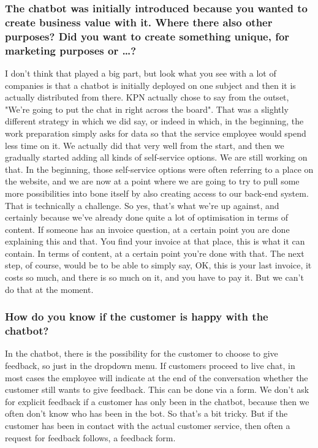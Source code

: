 \begin{appendices}
	\subsubsection{The chatbot was initially introduced because you wanted to create business value with it. Where there also other purposes? Did you want to create something unique, for marketing purposes or …?}
	I don't think that played a big part, but look what you see with a lot of companies is that a chatbot is initially deployed on one subject and then it is actually distributed from there. KPN actually chose to say from the outset, "We're going to put the chat in right across the board". That was a slightly different strategy in which we did say, or indeed in which, in the beginning, the work preparation simply asks for data so that the service employee would spend less time on it. We actually did that very well from the start, and then we gradually started adding all kinds of self-service options. We are still working on that. In the beginning, those self-service options were often referring to a place on the website, and we are now at a point where we are going to try to pull some more possibilities into bone itself by also creating access to our back-end system. That is technically a challenge. So yes, that's what we're up against, and certainly because we've already done quite a lot of optimisation in terms of content. If someone has an invoice question, at a certain point you are done explaining this and that. You find your invoice at that place, this is what it can contain. In terms of content, at a certain point you're done with that. The next step, of course, would be to be able to simply say, OK, this is your last invoice, it costs so much, and there is so much on it, and you have to pay it. But we can't do that at the moment.
	
	\subsubsection{How do you know if the customer is happy with the chatbot?}
	In the chatbot, there is the possibility for the customer to choose to give feedback, so just in the dropdown menu. If customers proceed to live chat, in most cases the employee will indicate at the end of the conversation whether the customer still wants to give feedback. This can be done via a form. We don't ask for explicit feedback if a customer has only been in the chatbot, because then we often don't know who has been in the bot. So that's a bit tricky. But if the customer has been in contact with the actual customer service, then often a request for feedback follows, a feedback form. 
	

\end{appendices}
